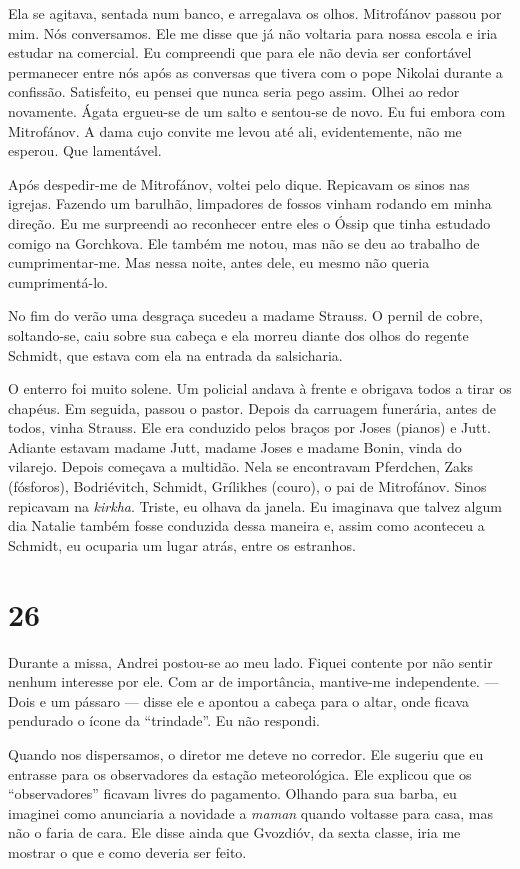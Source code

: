 Ela se agitava, sentada num banco, e arregalava os olhos. Mitrofánov
passou por mim. Nós conversamos. Ele me disse que já não voltaria para
nossa escola e iria estudar na comercial. Eu compreendi que para ele não
devia ser confortável permanecer entre nós após as conversas que tivera
com o pope Nikolai durante a confissão. Satisfeito, eu pensei que nunca
seria pego assim. Olhei ao redor novamente. Ágata ergueu-se de um salto
e sentou-se de novo. Eu fui embora com Mitrofánov. A dama cujo convite
me levou até ali, evidentemente, não me esperou. Que lamentável.

Após despedir-me de Mitrofánov, voltei pelo dique. Repicavam os sinos
nas igrejas. Fazendo um barulhão, limpadores de fossos vinham rodando em
minha direção. Eu me surpreendi ao reconhecer entre eles o Óssip que
tinha estudado comigo na Gorchkova. Ele também me notou, mas não se deu
ao trabalho de cumprimentar-me. Mas nessa noite, antes dele, eu mesmo
não queria cumprimentá-lo.

No fim do verão uma desgraça sucedeu a madame Strauss. O pernil de
cobre, soltando-se, caiu sobre sua cabeça e ela morreu diante dos olhos
do regente Schmidt, que estava com ela na entrada da salsicharia.

O enterro foi muito solene. Um policial andava à frente e obrigava todos
a tirar os chapéus. Em seguida, passou o pastor. Depois da carruagem
funerária, antes de todos, vinha Strauss. Ele era conduzido pelos braços
por Joses (pianos) e Jutt. Adiante estavam madame Jutt, madame Joses e
madame Bonin, vinda do vilarejo. Depois começava a multidão. Nela se
encontravam Pferdchen, Zaks (fósforos), Bodriévitch, Schmidt, Grílikhes
(couro), o pai de Mitrofánov. Sinos repicavam na \emph{kirkha}. Triste,
eu olhava da janela. Eu imaginava que talvez algum dia Natalie também
fosse conduzida dessa maneira e, assim como aconteceu a Schmidt, eu
ocuparia um lugar atrás, entre os estranhos.

\section{26}

Durante a missa, Andrei postou-se ao meu lado. Fiquei contente por não
sentir nenhum interesse por ele. Com ar de importância, mantive-me
independente. --- Dois e um pássaro --- disse ele e apontou a cabeça
para o altar, onde ficava pendurado o ícone da ``trindade''. Eu não
respondi.

Quando nos dispersamos, o diretor me deteve no corredor. Ele sugeriu que
eu entrasse para os observadores da estação meteorológica. Ele explicou
que os ``observadores'' ficavam livres do pagamento. Olhando para sua
barba, eu imaginei como anunciaria a novidade a \emph{maman} quando
voltasse para casa, mas não o faria de cara. Ele disse ainda que
Gvozdióv, da sexta classe, iria me mostrar o que e como deveria ser
feito.

